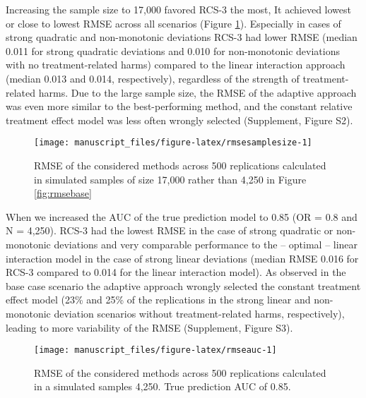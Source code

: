 \documentclass[]{elsarticle} %
\begin{document}
Increasing the sample size to 17,000 favored RCS-3 the most, It achieved
lowest or close to lowest RMSE across all scenarios (Figure
\ref{fig:rmsesamplesize}). Especially in cases of strong quadratic and
non-monotonic deviations RCS-3 had lower RMSE (median 0.011 for strong
quadratic deviations and 0.010 for non-monotonic deviations with no
treatment-related harms) compared to the linear interaction approach
(median 0.013 and 0.014, respectively), regardless of the strength of
treatment-related harms. Due to the large sample size, the RMSE of the
adaptive approach was even more similar to the best-performing method,
and the constant relative treatment effect model was less often wrongly
selected (Supplement, Figure S2).

\begin{figure}
\texttt{[image: manuscript\_files/figure-latex/rmsesamplesize-1]} \caption{RMSE of the considered methods across 500 replications calculated in simulated samples of size 17,000 rather than 4,250 in Figure \ref{fig:rmsebase}}\label{fig:rmsesamplesize}
\end{figure}

When we increased the AUC of the true prediction model to 0.85 (OR = 0.8
and N = 4,250). RCS-3 had the lowest RMSE in the case of strong
quadratic or non-monotonic deviations and very comparable performance to
the -- optimal -- linear interaction model in the case of strong linear
deviations (median RMSE 0.016 for RCS-3 compared to 0.014 for the linear
interaction model). As observed in the base case scenario the adaptive
approach wrongly selected the constant treatment effect model (23\% and
25\% of the replications in the strong linear and non-monotonic
deviation scenarios without treatment-related harms, respectively),
leading to more variability of the RMSE (Supplement, Figure S3).

\begin{figure}
\texttt{[image: manuscript\_files/figure-latex/rmseauc-1]} \caption{RMSE of the considered methods across 500 replications calculated in a simulated samples 4,250. True prediction AUC of 0.85.}\label{fig:rmseauc}
\end{figure}
\end{document}
